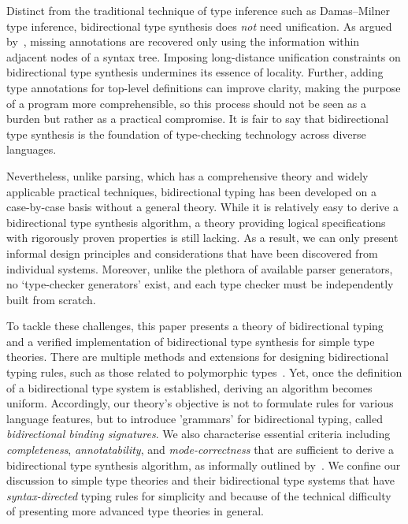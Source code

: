 Distinct from the traditional technique of type inference such as Damas--Milner type inference, bidirectional type synthesis does \emph{not} need unification.
As argued by~\citet{Pierce2000}, missing annotations are recovered only using the information within adjacent nodes of a syntax tree.
Imposing long-distance unification constraints on bidirectional type synthesis undermines its essence of locality.
Further, adding type annotations for top-level definitions can improve clarity, making the purpose of a program more comprehensible, so this process should not be seen as a burden but rather as a practical compromise.
It is fair to say that bidirectional type synthesis is the foundation of type-checking technology across diverse languages.

Nevertheless, unlike parsing, which has a comprehensive theory and widely applicable practical techniques, bidirectional typing has been developed on a case-by-case basis without a general theory.
While it is relatively easy to derive a bidirectional type synthesis algorithm, a theory providing logical specifications with rigorously proven properties is still lacking.
As a result, we can only present informal design principles and considerations that have been discovered from individual systems.
Moreover, unlike the plethora of available parser generators, no `type-checker generators' exist, and each type checker must be independently built from scratch.

To tackle these challenges, this paper presents a theory of bidirectional typing and a verified implementation of bidirectional type synthesis for simple type theories.
There are multiple methods and extensions for designing bidirectional typing rules, such as those related to polymorphic types~\citep{Pierce2000,Peyton-Jones2007,Dunfield2013,Xie2018}.
Yet, once the definition of a bidirectional type system is established, deriving an algorithm becomes uniform.
Accordingly, our theory's objective is not to formulate rules for various language features, but to introduce 'grammars' for bidirectional typing, called \emph{bidirectional binding signatures}.
We also characterise essential criteria including \emph{completeness}, \emph{annotatability}, and \emph{mode-correctness} that are sufficient to derive a bidirectional type synthesis algorithm, as informally outlined by~\citet{Dunfield2021}.
We confine our discussion to simple type theories and their bidirectional type systems that have \emph{syntax-directed} typing rules for simplicity and because of the technical difficulty of presenting more advanced type theories in general.

